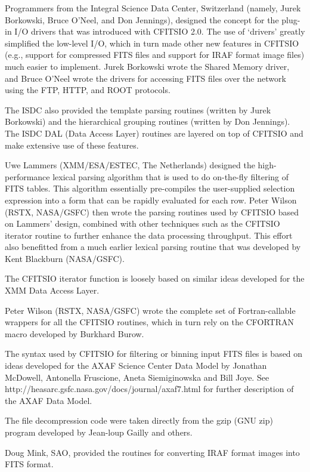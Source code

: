 \documentclass[11pt]{book}
\begin{document}
Programmers from the Integral Science Data Center, Switzerland (namely,
Jurek Borkowski, Bruce O'Neel, and Don Jennings), designed the concept
for the plug-in I/O drivers that was introduced with CFITSIO 2.0.  The
use of `drivers' greatly simplified  the low-level I/O, which in turn
made other new features in CFITSIO (e.g., support for compressed FITS
files and support for IRAF format image files) much easier to
implement.  Jurek Borkowski wrote the Shared Memory driver, and Bruce
O'Neel wrote the drivers for accessing FITS files over the network
using the FTP, HTTP, and ROOT protocols.

The ISDC also provided the template parsing routines (written by Jurek
Borkowski) and the hierarchical grouping routines (written by Don
Jennings).  The ISDC DAL (Data Access Layer) routines are layered on
top of CFITSIO and make extensive use of these features.

Uwe Lammers (XMM/ESA/ESTEC, The Netherlands) designed the
high-performance lexical parsing algorithm that is used to do
on-the-fly filtering of FITS tables.  This algorithm essentially
pre-compiles the user-supplied selection expression into a form that
can be rapidly evaluated for each row.  Peter Wilson (RSTX, NASA/GSFC)
then wrote the parsing routines used by CFITSIO based on Lammers'
design, combined with other techniques such as the CFITSIO iterator
routine to further enhance the data processing throughput.  This effort
also benefitted from a much earlier lexical parsing routine that was
developed by Kent Blackburn (NASA/GSFC).

The CFITSIO iterator function is loosely based on similar ideas
developed for the XMM Data Access Layer.

Peter Wilson (RSTX, NASA/GSFC) wrote the complete set of
Fortran-callable wrappers for all the CFITSIO routines, which in turn
rely on the CFORTRAN macro developed by Burkhard Burow.

The syntax used by CFITSIO for filtering or binning input FITS files is
based on ideas developed for the AXAF Science Center Data Model by
Jonathan McDowell, Antonella Fruscione, Aneta Siemiginowska and Bill
Joye. See http://heasarc.gsfc.nasa.gov/docs/journal/axaf7.html for
further description of the AXAF Data Model.

The file decompression code were taken directly from the gzip (GNU zip)
program developed by Jean-loup Gailly and others.

Doug Mink, SAO, provided the routines for converting IRAF format
images into FITS format.
\end{document}

